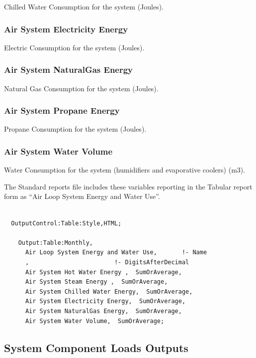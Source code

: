 Chilled Water Consumption for the system (Joules).

\subsubsection{Air System Electricity Energy}\label{air-system-electric-energy}

Electric Consumption for the system (Joules).

\subsubsection{Air System NaturalGas Energy}\label{air-system-gas-energy}

Natural Gas Consumption for the system (Joules).

\subsubsection{Air System Propane Energy}

Propane Consumption for the system (Joules).

\subsubsection{Air System Water Volume}\label{air-system-water-volume}

Water Consumption for the system (humidifiers and evaporative coolers) (m3).

The Standard reports file includes these variables reporting in the Tabular report form as ``Air Loop System Energy and Water Use''.

\begin{lstlisting}

  OutputControl:Table:Style,HTML;

    Output:Table:Monthly,
      Air Loop System Energy and Water Use,       !- Name
      ,                        !- DigitsAfterDecimal
      Air System Hot Water Energy ,  SumOrAverage,
      Air System Steam Energy ,  SumOrAverage,
      Air System Chilled Water Energy,  SumOrAverage,
      Air System Electricity Energy,  SumOrAverage,
      Air System NaturalGas Energy,  SumOrAverage,
      Air System Water Volume,  SumOrAverage;
\end{lstlisting}

\subsection{System Component Loads Outputs}\label{system-component-loads-outputs}

